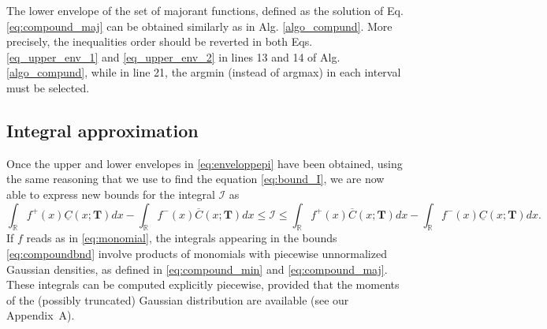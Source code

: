 \documentclass[review]{elsarticle}
\newcommand{\Ic}{\mathcal{I}}
\newcommand{\bR}{\mathbb{R}}
\newcommand{\emilie}[1]{\textcolor{magenta}{\textbf{[{\em EMILIE SAYS}: #1]}}}
\newcommand{\victor}[1]{\textcolor{blue}{\textbf{[{\em VICTOR SAYS}: #1]}}}
\newcommand{\solal}[1]{\textcolor{green}{\textbf{[{\em SOLAL SAYS}: #1]}}}
\begin{document}



The lower envelope of the set of majorant functions, defined as the solution of Eq. \eqref{eq:compound_maj} can be obtained similarly as in Alg. \ref{algo_compund}. More precisely, the inequalities order should be reverted in both Eqs. \eqref{eq_upper_env_1} and \eqref{eq_upper_env_2} in lines 13 and 14 of Alg. \ref{algo_compund}, while in line 21, the argmin (instead of argmax) in each interval must be selected.
\subsection{Integral approximation}

Once the upper and lower envelopes in \eqref{eq:enveloppepi} have been obtained, using the same reasoning that we use to find the equation \ref{eq:bound_I}, we are now able to express new bounds for the integral $\Ic$ as
\begin{equation}
\int_{\bR} f^+(x) \underline{C}(x;\mathbf{T} ) dx -  \int_{\bR} f^-(x) \overline{C}(x;\mathbf{T} ) dx\leq \Ic \leq \int_{\bR} f^+(x) \overline{C}(x;\mathbf{T} ) dx -\int_{\bR} f^-(x) \underline{C}(x;\mathbf{T} ) dx.
\label{eq:compoundbnd}
\end{equation}
If $f$ reads as in \eqref{eq:monomial}, the integrals appearing in the bounds \eqref{eq:compoundbnd} involve products of monomials with piecewise unnormalized Gaussian densities, as defined in \eqref{eq:compound_min} and \eqref{eq:compound_maj}. These integrals can be computed explicitly piecewise, provided that the moments of the (possibly truncated) Gaussian distribution are available (see our Appendix~A). 
\end{document}
